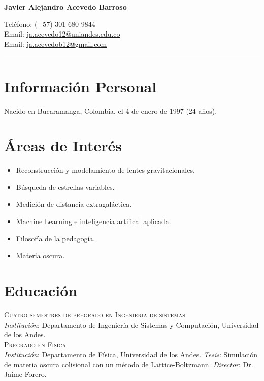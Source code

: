\documentclass[11pt, a4paper]{article}
\newcommand{\years}[1]{\marginnote{\scriptsize #1}}
\begin{document}
\begin{center}{\huge \bf Javier Alejandro Acevedo Barroso}\\[1cm]\end{center}
\begin{minipage}[t]{0.465\textwidth}
  Teléfono: (+57) 301-680-9844 \\
  Email: \href{mailto:ja.acevedo12@uniandes.edu.co}{ja.acevedo12@uniandes.edu.co}\\
  Email: \href{mailto:ja.acevedob12@gmail.com}{ja.acevedob12@gmail.com}\\
\end{minipage}

\hrule

\section*{Información Personal}
Nacido en Bucaramanga, Colombia, el 4 de enero de 1997 (24 años).

\section*{Áreas de Interés}
\begin{itemize}
\item Reconstrucción y modelamiento de lentes gravitacionales.
\item Búsqueda de estrellas variables.
\item Medición de distancia extragaláctica.
\item Machine Learning e inteligencia artifical aplicada.
\item Filosofía de la pedagogía.
\item Materia oscura.

\end{itemize}

\section*{Educación}
\noindent
\years{2015-2017}\textsc{Cuatro semestres de pregrado en Ingeniería de sistemas}\\ {\emph{Institución}}: Departamento de Ingeniería de Sistemas y Computación, Universidad de los Andes.\\

\years{2015-2019}\textsc{Pregrado en Física}\\ {\emph{Institución}}: Departamento de Física, Universidad de los Andes. {\emph{Tesis}}: Simulación de materia oscura colisional con un método de Lattice-Boltzmann. {\emph{Director}}: Dr. Jaime Forero.\\
\end{document}
